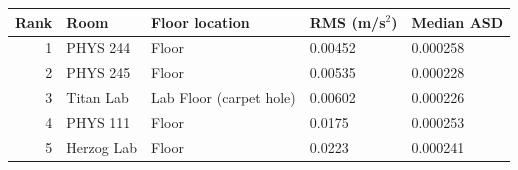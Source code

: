 \begin{tabular}{rllll}
\toprule
Rank & Room & Floor location & RMS (m/s$^2$) & Median ASD \\
\midrule
1 & PHYS 244 & Floor & 0.00452 & 0.000258 \\
2 & PHYS 245 & Floor & 0.00535 & 0.000228 \\
3 & Titan Lab & Lab Floor (carpet hole) & 0.00602 & 0.000226 \\
4 & PHYS 111 & Floor & 0.0175 & 0.000253 \\
5 & Herzog Lab & Floor & 0.0223 & 0.000241 \\
\bottomrule
\end{tabular}

